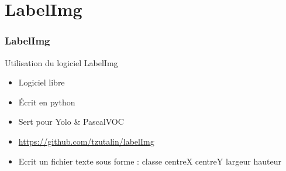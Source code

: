 \documentclass[12pt]{beamer}
\begin{document}
	\section{LabelImg}
	\begin{frame}[allowframebreaks]
	    \frametitle{LabelImg}
	     \begin{block}{Utilisation du logiciel LabelImg}
	        \begin{itemize}
	            [triangle]
	            \item Logiciel libre
	            \item Écrit en python
	            \item Sert pour Yolo \& PascalVOC
	            \item \url{https://github.com/tzutalin/labelImg}
	            \item Ecrit un fichier texte sous forme : classe centreX centreY largeur hauteur
	        \end{itemize}
	    \end{block}
    \end{frame}
\end{document}
